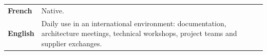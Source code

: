 
\begin{tabularx}{\textwidth}{@{}>{\bfseries}p{3.3cm}X@{}}
French & Native.\\
English & Daily use in an international environment: documentation, architecture meetings, technical workshops, project teams and supplier exchanges.\\
\end{tabularx}
